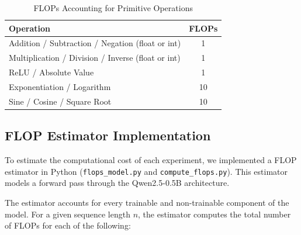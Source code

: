 \documentclass[a4paper,12pt]{article}
\begin{document}
\begin{table}[h]
  \centering

  \begin{tabular}{lc}
    \hline
    Operation & FLOPs \\
    \hline
    Addition / Subtraction / Negation (float or int) & 1 \\
    Multiplication / Division / Inverse (float or int) & 1 \\
    ReLU / Absolute Value & 1 \\
    Exponentiation / Logarithm & 10 \\
    Sine / Cosine / Square Root & 10 \\
    \hline
  \end{tabular}
  \vspace{0.2cm}
  \caption{FLOPs Accounting for Primitive Operations}
  \label{tab:flops_primitives}
\end{table}

\subsection*{FLOP Estimator Implementation}

To estimate the computational cost of each experiment, we implemented a FLOP estimator in Python (\texttt{flops\_model.py} and \texttt{compute\_flops.py}). This estimator models a forward pass through the Qwen2.5-0.5B architecture.

The estimator accounts for every trainable and non-trainable component of the model. For a given sequence length $n$, the estimator computes the total number of FLOPs for each of the following:
\end{document}
